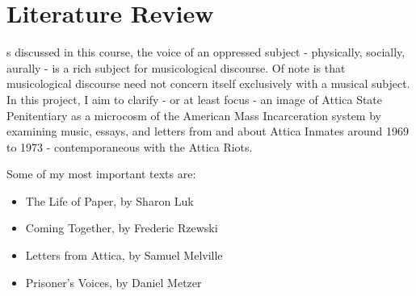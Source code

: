 \documentclass[12pt,letterpaper]{article}
\begin{document}
\section*{Literature Review}

s discussed in this course, the voice of an oppressed subject - physically, 
socially, aurally - is a rich subject for musicological discourse. Of note is 
that musicological discourse need not concern itself exclusively with a 
musical subject. In this project, I aim to clarify - or at least focus - an 
image of Attica State Penitentiary as a microcosm of the American Mass Incarceration 
system by examining music, essays, and letters from and about Attica Inmates around 
1969 to 1973 - contemporaneous with the Attica Riots. 

Some of my most important texts are: 

\begin{itemize}

	\item The Life of Paper, by Sharon Luk\\
	
	\clearpage
	
	\item Coming Together, by Frederic Rzewski\\

	\item Letters from Attica, by Samuel Melville\\
	
	\item Prisoner's Voices, by Daniel Metzer\\

\end{itemize}
\end{document}
